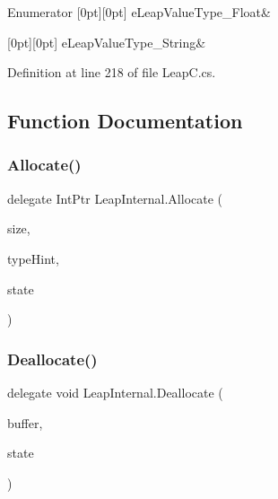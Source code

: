 \begin{DoxyEnumFields}{Enumerator}
[0pt][0pt]{}\mbox{\label{namespace_leap_internal_a9c15e305893cd05c1ec6d65cea48737cafa1be53efc0f7d2ca1bfe5e2d9b1e50b}} 
e\+Leap\+Value\+Type\+\_\+\+Float&\\
\hline

[0pt][0pt]{}\mbox{\label{namespace_leap_internal_a9c15e305893cd05c1ec6d65cea48737cae1eb4d31ca9ca73934c9b70a9d6eb5ca}} 
e\+Leap\+Value\+Type\+\_\+\+String&\\
\hline

\end{DoxyEnumFields}


Definition at line 218 of file Leap\+C.\+cs.



\subsection{Function Documentation}
\mbox{\label{namespace_leap_internal_abdbcd89d8bb63e029a380256e3679660}} 
\subsubsection{\texorpdfstring{Allocate()}{Allocate()}}
{\footnotesize\ttfamily delegate Int\+Ptr Leap\+Internal.\+Allocate (\begin{DoxyParamCaption}\item[{U\+Int32}]{size,  }\item[{\mbox{\hyperlink{namespace_leap_internal_a0c50b13c3367bbb0a225d62335fb6aab}{e\+Leap\+Allocator\+Type}}}]{type\+Hint,  }\item[{Int\+Ptr}]{state }\end{DoxyParamCaption})}

\mbox{\label{namespace_leap_internal_a5a737b35c25482e1d39e14a9d766553a}} 
\subsubsection{\texorpdfstring{Deallocate()}{Deallocate()}}
{\footnotesize\ttfamily delegate void Leap\+Internal.\+Deallocate (\begin{DoxyParamCaption}\item[{Int\+Ptr}]{buffer,  }\item[{Int\+Ptr}]{state }\end{DoxyParamCaption})}

